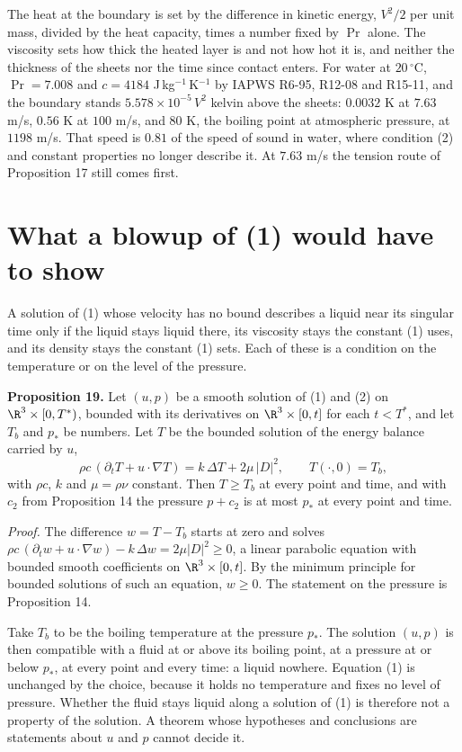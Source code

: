 The heat at the boundary is set by the difference in kinetic energy, $V^2/2$ per unit mass,
divided by the heat capacity, times a number fixed by $\Pr$ alone. The viscosity sets how thick
the heated layer is and not how hot it is, and neither the thickness of the sheets nor the time
since contact enters. For water at $20\,^\circ$C, $\Pr = 7.008$ and $c = 4184$
J\,kg$^{-1}$\,K$^{-1}$ by IAPWS R6-95, R12-08 and R15-11, and the boundary stands
$5.578\times10^{-5}\,V^2$ kelvin above the sheets: $0.0032$ K at $7.63$ m/s, $0.56$ K at
$100$ m/s, and $80$ K, the boiling point at atmospheric pressure, at $1198$ m/s. That speed is
$0.81$ of the speed of sound in water, where condition (2) and constant properties no longer
describe it. At $7.63$ m/s the tension route of Proposition 17 still comes first.

\section{What a blowup of (1) would have to show}

A solution of (1) whose velocity has no bound describes a liquid near its singular time only if the
liquid stays liquid there, its viscosity stays the constant (1) uses, and its density stays the
constant (1) sets. Each of these is a condition on the temperature or on the level of the pressure.

\textbf{Proposition 19.} Let $(u,p)$ be a smooth solution of (1) and (2) on $\R^3\times[0,T^*)$,
bounded with its derivatives on $\R^3\times[0,t]$ for each $t < T^*$, and let $T_b$ and $p_*$ be
numbers. Let $T$ be the bounded solution of the energy balance carried by $u$,
\[
\rho c\,(\partial_t T + u\cdot\nabla T) = k\,\Delta T + 2\mu\,|D|^2, \qquad T(\cdot,0) = T_b,
\]
with $\rho c$, $k$ and $\mu = \rho\nu$ constant. Then $T \ge T_b$ at every point and time, and with
$c_2$ from Proposition 14 the pressure $p + c_2$ is at most $p_*$ at every point and time.

\emph{Proof.} The difference $w = T - T_b$ starts at zero and solves
$\rho c\,(\partial_t w + u\cdot\nabla w) - k\,\Delta w = 2\mu|D|^2 \ge 0$, a linear parabolic
equation with bounded smooth coefficients on $\R^3\times[0,t]$. By the minimum principle for
bounded solutions of such an equation, $w \ge 0$. The statement on the pressure is
Proposition 14. \hfill\qedsymbol

Take $T_b$ to be the boiling temperature at the pressure $p_*$. The solution $(u,p)$ is then
compatible with a fluid at or above its boiling point, at a pressure at or below $p_*$, at every
point and every time: a liquid nowhere. Equation (1) is unchanged by the choice, because it holds no
temperature and fixes no level of pressure. Whether the fluid stays liquid along a solution of (1)
is therefore not a property of the solution. A theorem whose hypotheses and conclusions are
statements about $u$ and $p$ cannot decide it.

